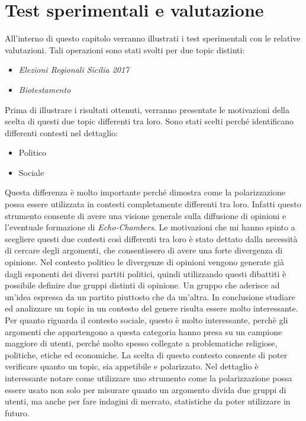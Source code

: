 \chapter{Test sperimentali e valutazione}
\label{capitolo6}
\thispagestyle{empty}




All'interno di questo capitolo verranno illustrati i test sperimentali con le relative valutazioni.
Tali operazioni sono stati svolti per due topic distinti:
\begin{itemize}
\item \textit{Elezioni Regionali Sicilia 2017}
\item \textit{Biotestamento}
\end{itemize}
Prima di illustrare i risultati ottenuti, verranno presentate le motivazioni della scelta di questi due topic differenti tra loro.
Sono stati scelti perché identificano differenti contesti nel dettaglio:
\begin{itemize}
\item Politico
\item Sociale
\end{itemize}
Questa differenza è molto importante perché dimostra come la polarizzazione possa essere utilizzata in contesti completamente differenti tra loro. Infatti questo strumento consente di avere una visione generale sulla diffusione di opinioni e l'eventuale formazione di \textit{Echo-Chambers}. 
Le motivazioni che mi hanno spinto a scegliere questi due contesti così differenti tra loro è stato dettato dalla necessità di cercare degli argomenti, che consentissero di avere una forte divergenza di opinione.
Nel contesto politico le divergenze di opinioni vengono generate già dagli esponenti dei diversi partiti politici, quindi utilizzando questi dibattiti è possibile definire due gruppi distinti di opinione. Un gruppo che aderisce ad un'idea espressa da un partito piuttosto che da un'altra. In conclusione studiare ed analizzare un topic in un contesto del genere risulta essere molto interessante.
Per quanto riguarda il contesto sociale, questo è molto interessante, perchè gli argomenti che appartengono a questa categoria hanno presa su un campione maggiore di utenti, perché molto spesso collegate a problematiche religiose, politiche, etiche ed economiche. La scelta di questo contesto consente di poter verificare quanto un topic, sia appetibile e polarizzato. Nel dettaglio è interessante notare come utilizzare uno strumento come la polarizzazione possa essere usato non solo per misurare quanto un argomento divida due gruppi di utenti, ma anche per fare indagini di mercato, statistiche da poter utilizzare in futuro.
\newpage
